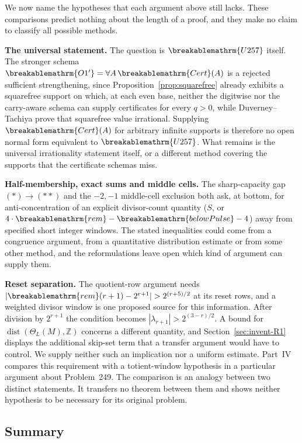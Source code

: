 \documentclass[11pt]{article}
\theoremstyle{plain}
\theoremstyle{definition}
\theoremstyle{remark}
\renewcommand{\mathrm}[1]{\ifmmode\breakablemathrm{#1}\else\textrm{#1}\fi}%
\begin{document}
We now name the hypotheses that each argument above still lacks.  These
comparisons predict nothing about the length of a proof, and they make no
claim to classify all possible methods.

\textbf{The universal statement.} The question is $\mathrm{U257}$ itself. The stronger schema
$\mathrm{O1'}=\forall A\,\mathrm{Cert}(A)$ is a rejected sufficient strengthening, since
Proposition~\ref{prop:squarefree} already exhibits a squarefree support on which, at each even base, neither the
digitwise nor the carry-aware schema can supply certificates for every $q>0$, while Duverney--Tachiya
prove that squarefree value irrational. Supplying $\mathrm{Cert}(A)$ for arbitrary infinite
supports is therefore no open normal form equivalent to $\mathrm{U257}$.  What remains
is the universal irrationality statement itself, or a different method covering the supports
that the certificate schemas miss.

\textbf{Half-membership, exact sums and middle cells.} The sharp-capacity gap $(\ast)\to(\ast\ast)$ and the
$-2,-1$ middle-cell exclusion both ask, at bottom, for anti-concentration of an explicit
divisor-count quantity ($\ensuremath{S}$, or $4\cdot\mathrm{rem}-\mathrm{belowPulse}-4$)
away from specified short integer windows.  The stated inequalities could come from a
congruence argument, from a quantitative distribution estimate or from some other method,
and the reformulations leave open which kind of argument can supply them.

\textbf{Reset separation.} The quotient-row argument
needs $|\mathrm{rem}(r+1)-2^{r+1}|>2^{(r+5)/2}$ at its reset rows,
and a weighted divisor window is one proposed source for this information.
After division by $2^{r+1}$ the condition becomes
$|\lambda_{r+1}|>2^{(3-r)/2}$.  A bound for
$\operatorname{dist}(\Theta_L(M),\mathbb Z)$ concerns a different
quantity, and Section~\ref{sec:invent-R1} displays the additional
skip-set term that a transfer argument would have to control.
We supply neither such an implication nor a uniform estimate.
Part~IV compares this requirement with a totient-window hypothesis in a particular
argument about Problem~249.  The comparison is an analogy between two distinct
statements.  It transfers no theorem between them and shows neither
hypothesis to be necessary for its original problem.

\subsection{Summary}
\end{document}
